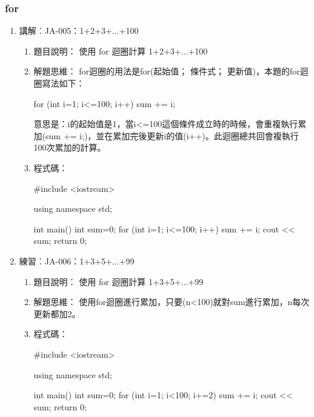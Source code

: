 \subsubsection {for}
\begin{enumerate}
	\item 講解︰JA-005：1+2+3+...+100
		\begin{enumerate}
			\item 題目說明：
			\subitem 使用 for 迴圈計算 1+2+3+...+100
			
			\item 解題思維：
			\subitem for迴圈的用法是for(起始值； 條件式； 更新值)，本題的for迴圈寫法如下：
			\begin{inside}
				for (int i=1; i<=100; i++) sum += i;
			\end{inside}
			意思是：i的起始值是1，當i<=100這個條件成立時的時候，會重複執行累加(sum += i;)，並在累加完後更新i的值(i++)。此迴圈總共回會複執行100次累加的計算。
			
			\item 程式碼：
			\begin{cppcode}
				#include <iostream>
				
				using namespace std;
				
				int main()
				{
					int sum=0;
					for (int i=1; i<=100; i++) sum += i;
					cout << sum;
					return 0;
				}
				
			\end{cppcode}
		\end{enumerate}
	
	\item 練習︰JA-006：1+3+5+...+99
		\begin{enumerate}
			\item 題目說明：
			\subitem 使用 for 迴圈計算 1+3+5+...+99
			
			\item 解題思維：
			\subitem 使用for迴圈進行累加，只要(n<100)就對sum進行累加，n每次更新都加2。
			
			\item 程式碼：
			\begin{cppcode}
			#include <iostream>
			
			using namespace std;
			
			int main()
			{
				int sum=0;
				for (int i=1; i<100; i+=2) sum += i;
				cout << sum;
				return 0;
			}
				
			\end{cppcode}
		\end{enumerate}
	
\end{enumerate}

